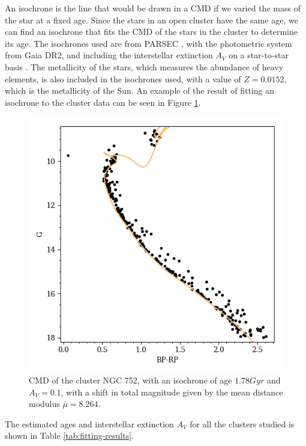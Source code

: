 \documentclass[twocolumn]{revtex4}
\begin{document}
An isochrone is the line that would be drawn in a CMD if we varied the mass of the star at a fixed age. Since the stars in an open cluster have the same age, we can find an isochrone that fits the CMD of the stars in the cluster to determine its age. The isochrones used are from PARSEC \cite{parsec}, with the photometric system from Gaia DR2, and including the interstellar extinction $A_V$ on a star-to-star basis \cite{girardi}. The metallicity of the stars, which measures the abundance of heavy elements, is also included in the isochrones used, with a value of $Z = 0.0152$, which is the metallicity of the Sun. An example of the result of fitting an isochrone to the cluster data can be seen in Figure \ref{nice-isochrone}.

\begin{figure}[h!]
\centering
\includegraphics[scale=0.65]{NGC_752}
\caption{CMD of the cluster NGC 752, with an isochrone of age $1.78 \si{Gyr}$ and $A_V = 0.1$, with a shift in total magnitude given by the mean distance modulus $\bar{\mu} = 8.264$.}
\label{nice-isochrone}
\end{figure}

The estimated ages and interstellar extinction $A_V$ for all the clusters studied is shown in Table \ref{tab:fitting-results}.
\end{document}
